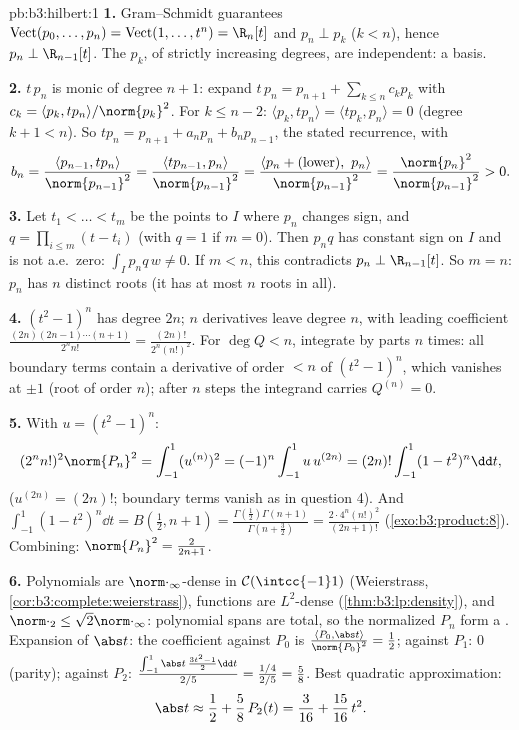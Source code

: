 \begin{solution}{pb:b3:hilbert:1}
\textbf{1.} Gram--Schmidt guarantees
$\operatorname{Vect}(p_0, \dots, p_n) =
\operatorname{Vect}(1, \dots, t^n) = \R_n[t]$ and $p_n \perp
p_k$ ($k < n$), hence $p_n \perp \R_{n-1}[t]$. The $p_k$, of
strictly increasing degrees, are independent: a basis.

\textbf{2.} $t\,p_n$ is monic of degree $n + 1$: expand
$t\,p_n = p_{n+1} + \sum_{k\leq n}c_kp_k$ with $c_k =
\langle p_k, tp_n\rangle/\norm{p_k}^2$. For $k \leq n - 2$:
$\langle p_k, tp_n\rangle = \langle tp_k, p_n\rangle = 0$
(degree $k + 1 < n$). So $tp_n = p_{n+1} + a_np_n +
b_np_{n-1}$, the stated recurrence, with
\[
b_n = \frac{\langle p_{n-1}, tp_n\rangle}{\norm{p_{n-1}}^2}
= \frac{\langle tp_{n-1}, p_n\rangle}{\norm{p_{n-1}}^2}
= \frac{\langle p_n + (\text{lower}),\
p_n\rangle}{\norm{p_{n-1}}^2}
= \frac{\norm{p_n}^2}{\norm{p_{n-1}}^2} > 0 .
\]

\textbf{3.} Let $t_1 < \dots < t_m$ be the points  to
$I$ where $p_n$ changes sign, and $q = \prod_{i\leq m}(t -
t_i)$ (with $q = 1$ if $m = 0$). Then $p_nq$ has constant sign
on $I$ and is not a.e.\ zero: $\int_Ip_nq\,w \neq 0$. If $m <
n$, this contradicts $p_n \perp \R_{n-1}[t]$. So $m = n$:
$p_n$ has $n$ distinct  roots (it has at most $n$
roots in all).

\textbf{4.} $(t^2 - 1)^n$ has degree $2n$; $n$ derivatives
leave degree $n$, with leading coefficient
$\frac{(2n)(2n-1)\cdots(n+1)}{2^nn!} =
\frac{(2n)!}{2^n(n!)^2}$. For $\deg Q < n$, integrate by parts
$n$ times: all boundary terms contain a derivative of order
$< n$ of $(t^2-1)^n$, which vanishes at $\pm1$ (root of order
$n$); after $n$ steps the integrand carries $Q^{(n)} = 0$.

\textbf{5.} With $u = (t^2 - 1)^n$:
\[
(2^nn!)^2\norm{P_n}^2 = \int_{-1}^1(u^{(n)})^2
= (-1)^n\int_{-1}^1 u\,u^{(2n)}
= (2n)!\int_{-1}^1(1 - t^2)^n\dd t ,
\]
($u^{(2n)} = (2n)!$; boundary terms vanish as in question 4).
And $\int_{-1}^1(1-t^2)^n\dd t = B(\tfrac12, n+1) =
\frac{\Gamma(\frac12)\Gamma(n+1)}{\Gamma(n + \frac32)} =
\frac{2\cdot4^n(n!)^2}{(2n+1)!}$
(\cref{exo:b3:product:8}). Combining: $\norm{P_n}^2 =
\frac{2}{2n + 1}$.

\textbf{6.} Polynomials are $\norm\cdot_\infty$-dense in
$\mathcal C(\intcc{-1}1)$ (Weierstrass,
\cref{cor:b3:complete:weierstrass}),  functions are
$L^2$-dense (\cref{thm:b3:lp:density}), and
$\norm\cdot_2 \leq \sqrt2\norm\cdot_\infty$: polynomial spans
are total, so the normalized $P_n$ form a .
Expansion of $\abs t$: the coefficient against $P_0$ is
$\frac{\langle P_0, \abs t\rangle}{\norm{P_0}^2} = \frac12$;
against $P_1$: $0$ (parity); against $P_2$:
$\frac{\int_{-1}^1\abs t\,\frac{3t^2-1}2\dd t}{2/5} =
\frac{1/4}{2/5} = \frac58$. Best quadratic approximation:
\[
\abs t \approx \frac12 + \frac58\,P_2(t) = \frac{3}{16} +
\frac{15}{16}\,t^2 .
\]


\end{solution}
